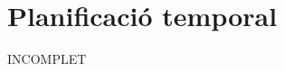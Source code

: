 \chapter{Planificació temporal}

INCOMPLET
\begin{comment}
\section{Anàlisi del problema}

La planificació temporal d'aquest primer periòde, com es pot veure a la taula \ref{llegenda-gantt-analisi}, es centra únicament en estudiar que es el que s'ha fet fins al moment, i per on sería millor tirar per a desenvolupar aquesta aplicació.

\begin{table}[h!]
	\caption{Llegenda del diagrama de Gantt \ref{gantt-analisi}}
	\label{llegenda-gantt-analisi}
	\begin{center}
		\begin{tabular}{| c | c |}
			\hline
			{\bf Identificador}	& {\bf Descripció} \\ \hline
			1					& Estudi de l'estat de l'art \\
			2					& Diseny de l'aplicació \\
			3					& Estudi de les tecnologies a utilitzar \\
			4					& Redacció de l'informe previ \\ \hline
		\end{tabular}
	\end{center}
\end{table}

\begin{figure}[h!]
	\caption{Gantt de l'anàlisi del problema}
	\label{gantt-analisi}
	\begin{center}
		\begin{ganttchart}[vgrid]{14}
			\gantttitle{2011}{12}
			\gantttitle{2012}{2} \\
			\gantttitlelist{41,...,52}{1}
			\gantttitlelist{1,...,2}{1} \\
			\ganttbar{1}{1}{4} \\
			\ganttlinkedbar{2}{5}{9} \\
			\ganttlinkedbar{3}{10}{12} \\
			\ganttlinkedbar{4}{13}{14}
		\end{ganttchart}
	\end{center}
\end{figure}


\end{comment}
